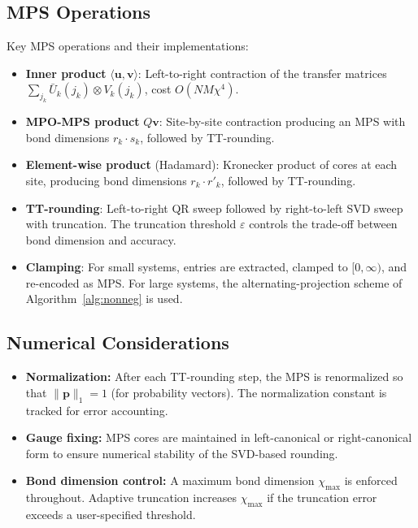 \documentclass[11pt]{article}
\newcommand{\norm}[1]{\lVert #1 \rVert}
\newcommand{\eps}{\varepsilon}
\begin{document}
\subsection{MPS Operations}

Key MPS operations and their implementations:

\begin{itemize}[itemsep=2pt]
\item \textbf{Inner product} $\langle\mathbf{u},\mathbf{v}\rangle$:
  Left-to-right contraction of the transfer matrices
  $\sum_{j_k} \bar{U}_k(j_k) \otimes V_k(j_k)$, cost $O(NM\chi^4)$.

\item \textbf{MPO-MPS product} $Q\mathbf{v}$:
  Site-by-site contraction producing an MPS with bond dimensions
  $r_k \cdot s_k$, followed by TT-rounding.

\item \textbf{Element-wise product} (Hadamard):
  Kronecker product of cores at each site, producing bond dimensions
  $r_k \cdot r'_k$, followed by TT-rounding.

\item \textbf{TT-rounding}:
  Left-to-right QR sweep followed by right-to-left SVD sweep with
  truncation.
  The truncation threshold $\eps$ controls the trade-off between
  bond dimension and accuracy.

\item \textbf{Clamping}:
  For small systems, entries are extracted, clamped to $[0,\infty)$,
  and re-encoded as MPS.
  For large systems, the alternating-projection scheme of
  Algorithm~\ref{alg:nonneg} is used.
\end{itemize}

\subsection{Numerical Considerations}

\begin{itemize}[itemsep=2pt]
\item \textbf{Normalization:}
  After each TT-rounding step, the MPS is renormalized so that
  $\norm{\mathbf{p}}_1 = 1$ (for probability vectors).
  The normalization constant is tracked for error accounting.

\item \textbf{Gauge fixing:}
  MPS cores are maintained in left-canonical or right-canonical
  form to ensure numerical stability of the SVD-based rounding.

\item \textbf{Bond dimension control:}
  A maximum bond dimension $\chi_{\max}$ is enforced throughout.
  Adaptive truncation increases $\chi_{\max}$ if the truncation error
  exceeds a user-specified threshold.
\end{itemize}
\end{document}
